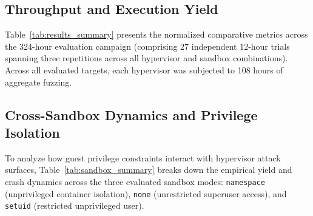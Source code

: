 \documentclass{article}
\begin{document}
\subsection{Throughput and Execution Yield}
Table~\ref{tab:results_summary} presents the normalized comparative metrics across the 324-hour evaluation campaign (comprising 27 independent 12-hour trials spanning three repetitions across all hypervisor and sandbox combinations). Across all evaluated targets, each hypervisor was subjected to 108 hours of aggregate fuzzing.

\begin{table}[h]
\centering
\small
\caption{Empirical Comparison Across QEMU, crosvm, and Firecracker (Normalized 324-Hour Campaign: 9 Runs $\times$ 12h per Hypervisor)}\label{tab:results_summary}
\end{table}

\subsection{Cross-Sandbox Dynamics and Privilege Isolation}
To analyze how guest privilege constraints interact with hypervisor attack surfaces, Table~\ref{tab:sandbox_summary} breaks down the empirical yield and crash dynamics across the three evaluated sandbox modes: \texttt{namespace} (unprivileged container isolation), \texttt{none} (unrestricted superuser access), and \texttt{setuid} (restricted unprivileged user).
\end{document}
